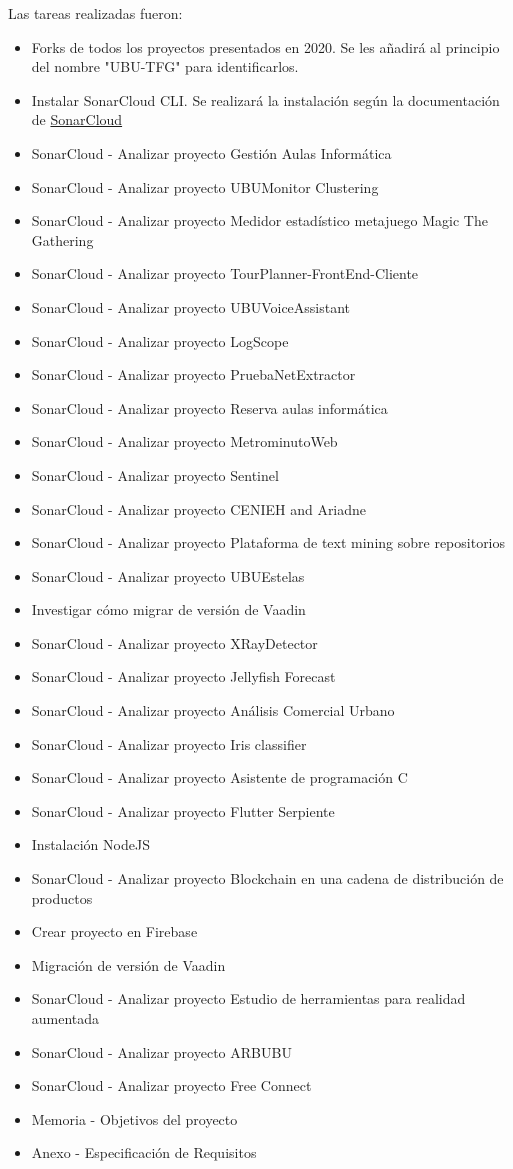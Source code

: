 Las tareas realizadas fueron:
\begin{itemize}
	\tightlist
	\item Forks de todos los proyectos presentados en 2020.
	Se les añadirá al principio del nombre "UBU-TFG" para identificarlos. 
	\item Instalar SonarCloud CLI.
	Se realizará la instalación según la documentación de \href{https://sonarcloud.io/documentation/analysis/scan/sonarscanner/}{SonarCloud} 
	\item SonarCloud - Analizar proyecto Gestión Aulas Informática
	\item SonarCloud - Analizar proyecto UBUMonitor Clustering
	\item SonarCloud - Analizar proyecto Medidor estadístico metajuego Magic The Gathering
	\item SonarCloud - Analizar proyecto TourPlanner-FrontEnd-Cliente
	\item SonarCloud - Analizar proyecto UBUVoiceAssistant
	\item SonarCloud - Analizar proyecto LogScope
	\item SonarCloud - Analizar proyecto PruebaNetExtractor
	\item SonarCloud - Analizar proyecto Reserva aulas informática
	\item SonarCloud - Analizar proyecto MetrominutoWeb
	\item SonarCloud - Analizar proyecto Sentinel
	\item SonarCloud - Analizar proyecto CENIEH and Ariadne
	\item SonarCloud - Analizar proyecto Plataforma de text mining sobre repositorios
	\item SonarCloud - Analizar proyecto UBUEstelas 
	\item Investigar cómo migrar de versión de Vaadin 
	\item SonarCloud - Analizar proyecto XRayDetector
	\item SonarCloud - Analizar proyecto Jellyfish Forecast
	\item SonarCloud - Analizar proyecto Análisis Comercial Urbano
	\item SonarCloud - Analizar proyecto Iris classifier
	\item SonarCloud - Analizar proyecto Asistente de programación C
	\item SonarCloud - Analizar proyecto Flutter Serpiente
	\item Instalación NodeJS
	\item SonarCloud - Analizar proyecto Blockchain en una cadena de distribución de productos
	\item Crear proyecto en Firebase
	\item Migración de versión de Vaadin
	\item SonarCloud - Analizar proyecto Estudio de herramientas para realidad aumentada
	\item SonarCloud - Analizar proyecto ARBUBU
	\item SonarCloud - Analizar proyecto Free Connect
	\item Memoria - Objetivos del proyecto 
	\item Anexo - Especificación de Requisitos
	

\end{itemize}
